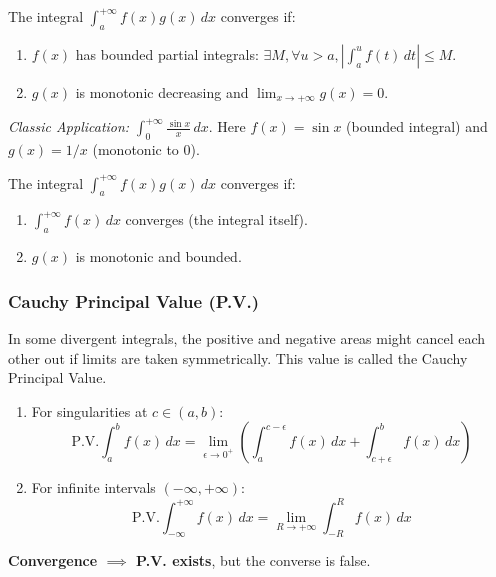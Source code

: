 \begin{theorem}
The integral $\int_a^{+\infty} f(x)g(x) \, dx$ converges if:
\begin{enumerate}
    \item $f(x)$ has bounded partial integrals: $\exists M, \forall u > a, |\int_a^u f(t) \, dt| \le M$.
    \item $g(x)$ is monotonic decreasing and $\lim_{x \to +\infty} g(x) = 0$.
\end{enumerate}
\end{theorem}
\textit{Classic Application:} $\int_0^{+\infty} \frac{\sin x}{x} \, dx$. Here $f(x)=\sin x$ (bounded integral) and $g(x)=1/x$ (monotonic to 0).

\begin{theorem}
The integral $\int_a^{+\infty} f(x)g(x) \, dx$ converges if:
\begin{enumerate}
    \item $\int_a^{+\infty} f(x) \, dx$ converges (the integral itself).
    \item $g(x)$ is monotonic and bounded.
\end{enumerate}
\end{theorem}

\subsubsection{Cauchy Principal Value (P.V.)}

In some divergent integrals, the positive and negative areas might cancel each other out if limits are taken symmetrically. This value is called the Cauchy Principal Value.

\begin{definition}
\begin{enumerate}
    \item For singularities at $c \in (a, b)$:
    \[
    \text{P.V.} \int_a^b f(x) \, dx = \lim_{\epsilon \to 0^+} \left( \int_a^{c-\epsilon} f(x) \, dx + \int_{c+\epsilon}^b f(x) \, dx \right)
    \]
    \item For infinite intervals $(-\infty, +\infty)$:
    \[
    \text{P.V.} \int_{-\infty}^{+\infty} f(x) \, dx = \lim_{R \to +\infty} \int_{-R}^R f(x) \, dx
    \]
\end{enumerate}
\end{definition}

\begin{remark}
\textbf{Convergence $\implies$ P.V. exists}, but the converse is false.
\end{remark}

